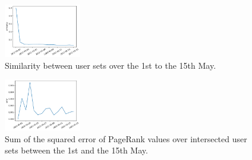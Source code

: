 \begin{figure}[hb!]
    \centering
    \includegraphics[width=0.3\textwidth]{figures/sim_days.pdf}
    \caption{Similarity between user sets over the 1st to the 15th May.}
    \label{fig:simdays}
\end{figure}
\begin{figure}[hb!]
    \centering
    \includegraphics[width=0.3\textwidth]{figures/error_days.pdf}
    \caption{Sum of the squared error of PageRank values over intersected user sets between the 1st and the 15th May.}
    \label{fig:errordays}
\end{figure}
